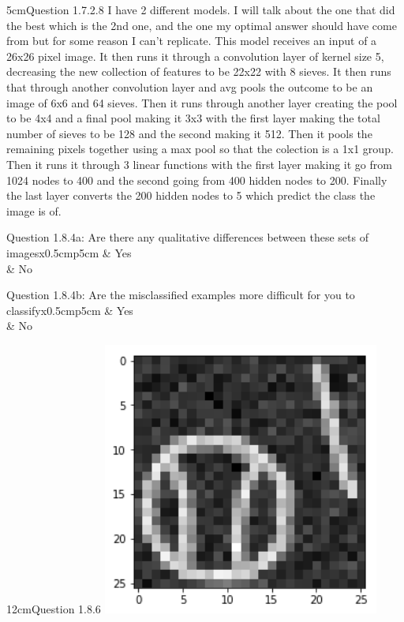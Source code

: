 \documentclass[11pt]{article}
\newcommand{\Checked}{{\LARGE \XBox}}%
\newcommand{\Unchecked}{{\LARGE \Square}}%
\newcommand{\answertextheight}{5cm}
\newcounter{QuestionCounter}
\newcounter{SubQuestionCounter}[QuestionCounter]
\newcommand{\newsubquestion}{\stepcounter{SubQuestionCounter}}
\begin{document}
{\begin{answertext}{\answertextheight}{Question 1.7.2.8}
I have 2 different models. I will talk about the one that did the best which is the 2nd one, and the one my optimal answer should have come from but for some reason I can't replicate.
This model receives an input of a 26x26 pixel image.
It then runs it through a convolution layer of kernel size 5, decreasing the new collection of features to be 22x22 with 8 sieves.
It then runs that through another convolution layer and avg pools the outcome to be an image of 6x6 and 64 sieves.
Then it runs through another layer creating the pool to be 4x4 and a final pool making it 3x3 with the first layer making the total number of sieves to be 128 and the second making it 512.
Then it pools the remaining pixels together using a max pool so that the colection is a 1x1 group.
Then it runs it through 3 linear functions with the first layer making it go from 1024 nodes to 400 and the second going from 400 hidden nodes to 200.
Finally the last layer converts the 200 hidden nodes to 5 which predict the class the image is of.
\end{answertext}
\newsubquestion


\renewcommand{\answertextheight}{6cm}

\begin{answertable}{2.5cm}{Question 1.8.4a: Are there any qualitative differences between these sets of images}{x{0.5cm}p{5cm}}
\Checked &  Yes \\ 
\Unchecked &  No \\ 
\end{answertable}

\begin{answertable}{2.5cm}{Question 1.8.4b: Are the misclassified examples more difficult for you to classify}{x{0.5cm}p{5cm}}
\Checked &  Yes \\ 
\Unchecked &  No \\ 
\end{answertable}

\renewcommand{\answertextheight}{12cm}

\begin{answertext}{\answertextheight}{Question 1.8.6}
\includegraphics[height=9cm]{1_8_6_HW3}
\end{answertext}

}
\end{document}
